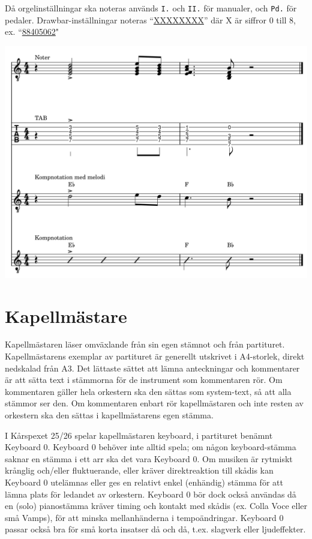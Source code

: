 Då orgelinställningar ska noteras används \verb|I.| och \verb|II.| för manualer, och \verb|Pd.| för pedaler. Drawbar-inställningar noteras ``\underline{XXXXXXXX}'' där X är siffror 0 till 8, ex. ``\underline{88405062}"

\begin{center}
    \includegraphics[width=\textwidth]{lilypond/kompnotation.cropped.png}
\end{center}

\section{Kapellmästare}
Kapellmästaren läser omväxlande från sin egen stämnot och från partituret. Kapellmästarens exemplar av partituret är generellt utskrivet i A4-storlek, direkt nedskalad från A3. Det lättaste sättet att lämna anteckningar och kommentarer är att sätta text i stämmorna för de instrument som kommentaren rör. Om kommentaren gäller hela orkestern ska den sättas som system-text, så att alla stämmor ser den. Om kommentaren enbart rör kapellmästaren och inte resten av orkestern ska den sättas i kapellmästarens egen stämma. 

I Kårspexet 25/26 spelar kapellmästaren keyboard, i partituret benämnt Keyboard 0. Keyboard 0 behöver inte alltid spela; om någon keyboard-stämma saknar en stämma i ett arr ska det vara Keyboard 0. Om musiken är rytmiskt krånglig och/eller fluktuerande, eller kräver direktreaktion till skådis kan Keyboard 0 utelämnas eller ges en relativt enkel (enhändig) stämma för att lämna plats för ledandet av orkestern. Keyboard 0 bör dock också användas då en (solo) pianostämma kräver timing och kontakt med skådis (ex. Colla Voce eller små Vamps), för att minska mellanhänderna i tempoändringar. Keyboard 0 passar också bra för små korta insatser då och då, t.ex. slagverk eller ljudeffekter.
